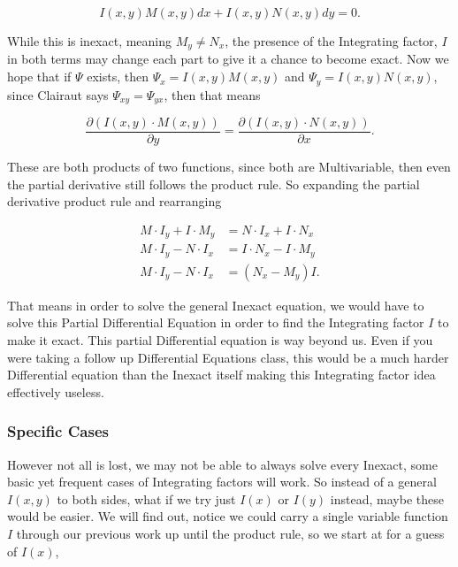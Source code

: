 \documentclass[12pt]{article}
\begin{document}
\begin{equation*}
    I(x,y)M(x,y)dx+I(x,y)N(x,y)dy = 0.
\end{equation*}

While this is inexact, meaning $M_y\neq N_x$, the presence of the Integrating factor, $I$ in both terms may change each part to give it a chance to become exact. Now we hope that if $\Psi$ exists, then $\Psi_x=I(x,y)M(x,y)$ and $\Psi_y=I(x,y)N(x,y)$, since Clairaut says $\Psi_{xy}=\Psi_{yx}$, then that means

\begin{equation*}
    \frac{\partial (I(x,y)\cdot M(x,y))}{\partial y} = \frac{\partial(I(x,y)\cdot N(x,y))}{\partial x}.
\end{equation*}

These are both products of two functions, since both are Multivariable, then even the partial derivative still follows the product rule. So expanding the partial derivative product rule and rearranging

\begin{align*}
    M\cdot I_y + I \cdot M_y &= N \cdot I_x + I\cdot N_x \\
    M\cdot I_y - N \cdot I_x &= I\cdot N_x - I \cdot M_y \\
    M\cdot I_y - N \cdot I_x &= (N_x - M_y)I.
\end{align*}

That means in order to solve the general Inexact equation, we would have to solve this Partial Differential Equation in order to find the Integrating factor $I$ to make it exact. This partial Differential equation is way beyond us. Even if you were taking a follow up Differential Equations class, this would be a much harder Differential equation than the Inexact itself making this Integrating factor idea effectively useless.

\subsubsection{Specific Cases}

However not all is lost, we may not be able to always solve every Inexact, some basic yet frequent cases of Integrating factors will work. So instead of a general $I(x,y)$ to both sides, what if we try just $I(x)$ or $I(y)$ instead, maybe these would be easier. We will find out, notice we could carry a single variable function $I$ through our previous work up until the product rule, so we start at for a guess of $I(x)$,
\end{document}
